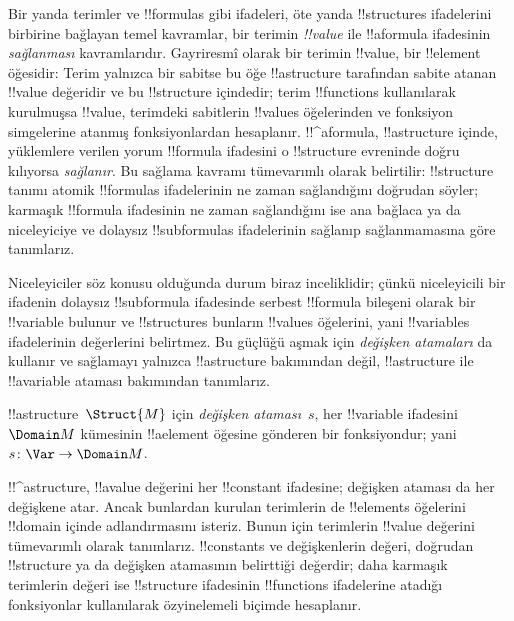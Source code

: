 \documentclass[../../../include/open-logic-section]{subfiles}
\begin{document}


\begin{explain}
Bir yanda terimler ve !!{formula}s gibi ifadeleri, öte yanda
!!{structure}s ifadelerini birbirine bağlayan temel kavramlar, bir
terimin \emph{!!{value}} ile !!a{formula} ifadesinin \emph{sağlanması}
kavramlarıdır. Gayriresmî olarak bir terimin !!{value}, bir !!{element}
öğesidir: Terim yalnızca bir sabitse bu öğe !!a{structure} tarafından
sabite atanan !!{value} değeridir ve bu !!{structure} içindedir; terim
!!{function}s
kullanılarak kurulmuşsa !!{value}, terimdeki sabitlerin !!{value}s
öğelerinden ve fonksiyon simgelerine atanmış fonksiyonlardan hesaplanır.
!!^a{formula}, !!a{structure} içinde, yüklemlere verilen yorum
!!{formula} ifadesini o !!{structure} evreninde doğru kılıyorsa
\emph{sağlanır}. Bu sağlama kavramı tümevarımlı olarak belirtilir:
!!{structure} tanımı atomik !!{formula}s ifadelerinin ne zaman
sağlandığını doğrudan söyler; karmaşık !!{formula} ifadesinin ne zaman
sağlandığını ise ana bağlaca ya da niceleyiciye ve dolaysız
!!{subformula}s ifadelerinin sağlanıp sağlanmamasına göre tanımlarız.

Niceleyiciler söz konusu olduğunda durum biraz inceliklidir; çünkü
niceleyicili bir ifadenin dolaysız !!{subformula} ifadesinde serbest
!!{formula} bileşeni olarak bir !!{variable} bulunur ve !!{structure}s
bunların !!{value}s öğelerini, yani !!{variable}s ifadelerinin
değerlerini belirtmez. Bu güçlüğü aşmak için
\emph{değişken atamaları} da kullanır ve sağlamayı yalnızca
!!a{structure} bakımından değil, !!a{structure} ile !!a{variable}
ataması bakımından tanımlarız.
\end{explain}

\begin{defn}
!!a{structure}~$\Struct{M}$ için \emph{değişken ataması}~$s$, her
!!{variable} ifadesini~$\Domain M$ kümesinin !!a{element} öğesine
gönderen bir fonksiyondur; yani $s\colon \Var \to \Domain M$.
\end{defn}

\begin{explain}
!!^a{structure}, !!a{value} değerini her !!{constant} ifadesine;
değişken ataması da her değişkene atar. Ancak bunlardan kurulan
terimlerin de !!{element}s öğelerini !!{domain} içinde adlandırmasını isteriz.
Bunun için terimlerin !!{value} değerini tümevarımlı olarak tanımlarız.
!!{constant}s ve değişkenlerin değeri, doğrudan !!{structure} ya da
değişken atamasının belirttiği değerdir; daha karmaşık terimlerin değeri
ise !!{structure} ifadesinin !!{function}s ifadelerine atadığı
fonksiyonlar kullanılarak özyinelemeli biçimde hesaplanır.
\end{explain}
\end{document}
